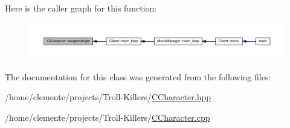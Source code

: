 Here is the caller graph for this function\+:\nopagebreak
\begin{figure}[H]
\begin{center}
\leavevmode
\includegraphics[width=350pt]{class_c_character_af64ec95c078f3e969cb6b961db81a488_icgraph}
\end{center}
\end{figure}




The documentation for this class was generated from the following files\+:\begin{DoxyCompactItemize}
\item 
/home/clemente/projects/\+Troll-\/\+Killers/\hyperlink{_c_character_8hpp}{C\+Character.\+hpp}\item 
/home/clemente/projects/\+Troll-\/\+Killers/\hyperlink{_c_character_8cpp}{C\+Character.\+cpp}\end{DoxyCompactItemize}
